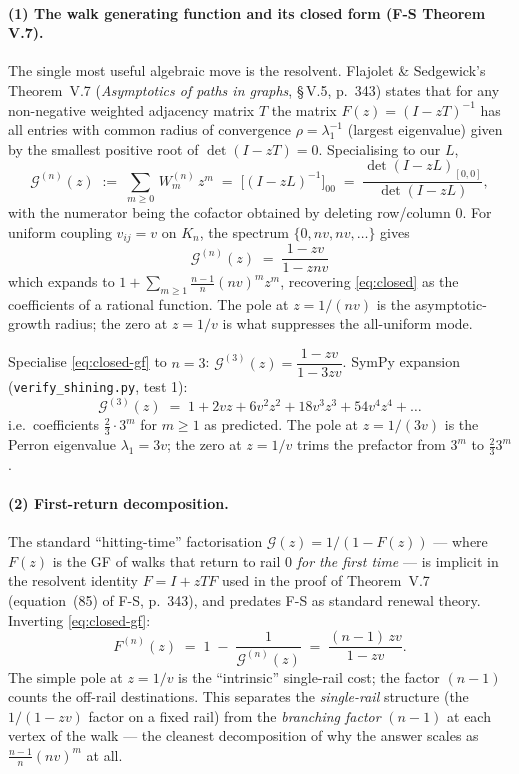 \documentclass[11pt,a4paper]{article}
\begin{document}
\paragraph{(1) The walk generating function and its closed form
(F-S Theorem V.7).}
The single most useful algebraic move is the resolvent. Flajolet \&
Sedgewick's Theorem~V.7 (\emph{Asymptotics of paths in graphs},
\S\,V.5, p.~343) states that for any non-negative weighted adjacency
matrix $T$ the matrix $F(z)=(I-zT)^{-1}$ has all entries with common
radius of convergence $\rho=\lambda_{1}^{-1}$ (largest eigenvalue) given
by the smallest positive root of $\det(I-zT)=0$. Specialising to our $L$,
\begin{equation}\label{eq:resolvent}
\mathcal G^{(n)}(z) \;:=\;
\sum_{m\geq 0}\,W^{(n)}_m\,z^{m}
\;=\; \big[(I - zL)^{-1}\big]_{00}
\;=\; \frac{\det(I - zL)_{[0,0]}}{\det(I - zL)},
\end{equation}
with the numerator being the cofactor obtained by deleting row/column $0$.
For uniform coupling $v_{ij}{=}v$ on $K_n$, the spectrum
$\{0,nv,nv,\ldots\}$ gives
\begin{equation}\label{eq:closed-gf}
\boxed{\;
\mathcal G^{(n)}(z) \;=\; \frac{1-zv}{1-znv}
\;}
\end{equation}
which expands to $1 + \sum_{m\geq 1}\frac{n-1}{n}(nv)^{m}z^{m}$,
recovering \eqref{eq:closed} as the coefficients of a rational function.
The pole at $z = 1/(nv)$ is the asymptotic-growth radius; the zero at
$z = 1/v$ is what suppresses the all-uniform mode.

\begin{examplebox}[title={Example (1$'$)\;\;Resolvent at $n{=}3$ uniform}]
Specialise \eqref{eq:closed-gf} to $n{=}3$:
$\mathcal G^{(3)}(z) = \dfrac{1-zv}{1-3zv}$.
SymPy expansion (\texttt{verify\_shining.py}, test 1):
\[
\mathcal G^{(3)}(z) \;=\; 1 + 2vz + 6v^{2}z^{2} + 18v^{3}z^{3} + 54v^{4}z^{4} + \dots
\]
i.e.\ coefficients $\frac{2}{3}\!\cdot\!3^{m}$ for $m\geq 1$ as predicted.
The pole at $z=1/(3v)$ is the Perron eigenvalue $\lambda_{1}{=}3v$; the
zero at $z{=}1/v$ trims the prefactor from $3^{m}$ to $\tfrac{2}{3}3^{m}$.
\end{examplebox}

\paragraph{(2) First-return decomposition.}
The standard ``hitting-time'' factorisation
$\mathcal G(z) = 1/(1 - F(z))$ --- where $F(z)$ is the GF of walks that
return to rail $0$ \emph{for the first time} --- is implicit in the
resolvent identity $F = I + zTF$ used in the proof of Theorem~V.7
(equation~(85) of F-S, p.~343), and predates F-S as standard renewal
theory. Inverting \eqref{eq:closed-gf}:
\[
F^{(n)}(z) \;=\; 1 \;-\; \frac{1}{\mathcal G^{(n)}(z)}
\;=\; \frac{(n-1)\,zv}{1-zv}.
\]
The simple pole at $z = 1/v$ is the ``intrinsic'' single-rail cost; the
factor $(n-1)$ counts the off-rail destinations. This separates the
\emph{single-rail} structure (the $1/(1-zv)$ factor on a fixed rail) from
the \emph{branching factor} $(n-1)$ at each vertex of the
walk --- the cleanest decomposition of why the answer scales as
$\frac{n-1}{n}(nv)^m$ at all.
\end{document}
